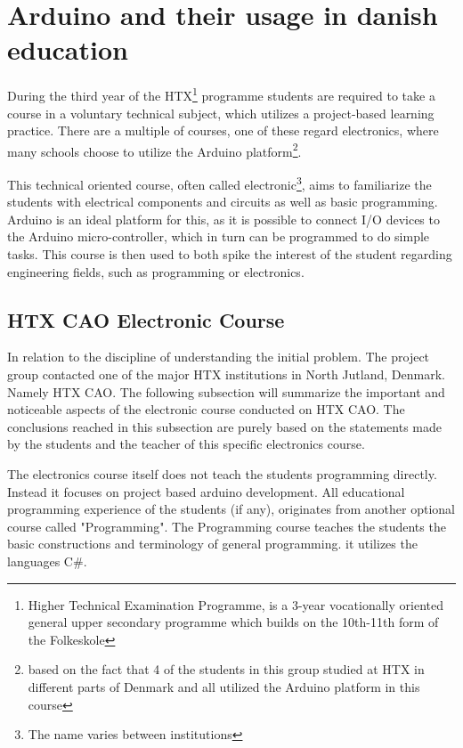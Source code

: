 % 

\section{Arduino and their usage in danish education}
During the third year of the HTX\footnote{Higher Technical Examination Programme, is a 3-year vocationally oriented general upper secondary programme which builds on the 10th-11th form of the Folkeskole\cite{htx_wiki}} programme students are required to take a course in a voluntary technical subject, which utilizes a project-based learning practice. 
There are a multiple of courses, one of these regard electronics, where many schools choose to utilize the Arduino platform\footnote{based on the fact that 4 of the students in this group studied at HTX in different parts of Denmark and all utilized the Arduino platform in this course}\cite{holstebro_education}.  

This technical oriented course, often called electronic\footnote{The name varies between institutions}, aims to familiarize the students with electrical components and circuits as well as basic programming.\cite{holstebro_electronic}
Arduino is an ideal platform for this, as it is possible to connect I/O devices to the Arduino micro-controller, which in turn can be programmed to do simple tasks. 
This course is then used to both spike the interest of the student regarding engineering fields, such as programming or electronics.

\subsection{HTX CAO Electronic Course}
In relation to the discipline of understanding the initial problem. The project group contacted one of the major HTX institutions in North Jutland, Denmark. Namely HTX CAO. The following subsection will summarize the important and noticeable aspects of the electronic course conducted on HTX CAO. The conclusions reached in this subsection are purely based on the statements made by the students and the teacher of this specific electronics course.

The electronics course itself does not teach the students programming directly. Instead it focuses on project based arduino development. All educational programming experience of the students (if any), originates from another optional course called "Programming". The Programming course teaches the students the basic constructions and terminology of general programming. it utilizes the languages C{\#}. 

